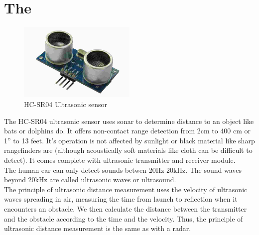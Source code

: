\section{The \hcsr{} \ultrasonic{}}
\begin{figure}[H]
	\centering
	\includegraphics[width=0.5\textwidth]{../Files/HCSR04.jpg}
	\caption{HC-SR04 Ultrasonic sensor}  \label{fig:HCSR}
\end{figure}
The HC-SR04 ultrasonic sensor uses sonar to determine distance to an object like bats or dolphins do. It offers non-contact range detection from 2cm to 400 cm or 1” to 13 feet. It's operation is not affected by sunlight or black material like sharp rangefinders are (although acoustically soft materials like cloth can be difficult to detect). It comes complete with ultrasonic transmitter and receiver module.\\
The human ear can only detect sounds betwen 20Hz-20kHz. The sound waves beyond 20kHz are called ultrasonic waves or ultrasound.\\
The principle of ultrasonic distance measurement uses the velocity of ultrasonic waves spreading in air, measuring the time from launch to reflection when it encounters an obstacle. We then calculate the distance between the transmitter and the obstacle according to the time and the velocity. Thus, the principle of ultrasonic distance measurement is the same as with a radar.

